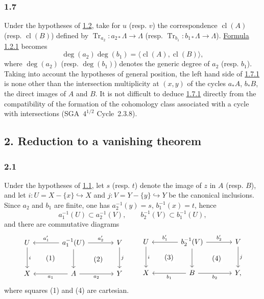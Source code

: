 \documentclass[11pt]{article}
\providecommand{\cl}{\operatorname{cl}}
\providecommand{\Tr}{\operatorname{Tr}}
\providecommand{\Tr}{\operatorname{Tr}}
\providecommand{\Tr}{\operatorname{Tr}}
\providecommand{\Tr}{\operatorname{Tr}}
\providecommand{\cl}{\operatorname{cl}}
\providecommand{\cl}{\operatorname{cl}}
\providecommand{\Tr}{\operatorname{Tr}}
\begin{document}
\subsubsection*{1.7}\label{sga5:IIIB:subsubsection:1.7}
Under the hypotheses of \hyperref[sga5:IIIB:theorem:1.2]{1.2}, take for $u$ (resp. $v$) the correspondence $\cl(A)$ (resp. $\cl(B)$) defined by $\Tr_{a_2}:a_{2*}\Lambda\to\Lambda$ (resp. $\Tr_{b_1}:b_{1*}\Lambda\to\Lambda$). \hyperref[sga5:IIIB:equation:1.2.1]{Formula 1.2.1} becomes
\begin{equation}\tag{1.7.1}\label{sga5:IIIB:equation:1.7.1}
\deg(a_2)\deg(b_1)=\langle \cl(A),\cl(B)\rangle,
\end{equation}
where $\deg(a_2)$ (resp. $\deg(b_1)$) denotes the generic degree of $a_2$ (resp. $b_1$). Taking into account the hypotheses of general position, the left hand side of \hyperref[sga5:IIIB:equation:1.7.1]{1.7.1} is none other than the intersection multiplicity at $(x,y)$ of the cycles $a_*A$, $b_*B$, the direct images of $A$ and $B$. It is not difficult to deduce \hyperref[sga5:IIIB:equation:1.7.1]{1.7.1} directly from the compatibility of the formation of the cohomology class associated with a cycle with intersections (SGA~$4^{1/2}$ Cycle~2.3.8).


\subsection*{2. Reduction to a vanishing theorem}\label{sga5:IIIB:subsection:2}

\subsubsection*{2.1}\label{sga5:IIIB:subsubsection:2.1}
Under the hypotheses of \hyperref[sga5:IIIB:subsubsection:1.1]{1.1}, let $s$ (resp. $t$) denote the image of $z$ in $A$ (resp. $B$), and let $i:U=X-\{x\}\hookrightarrow X$ and $j:V=Y-\{y\}\hookrightarrow Y$ be the canonical inclusions. Since $a_2$ and $b_1$ are finite, one has $a_2^{-1}(y)=s$, $b_1^{-1}(x)=t$, hence
\[
a_1^{-1}(U)\subset a_2^{-1}(V),\qquad b_2^{-1}(V)\subset b_1^{-1}(U),
\]
and there are commutative diagrams
\[
\begin{tikzcd}[column sep=large,row sep=large]
U \arrow[d,"i"] \arrow[rd,phantom,"(1)"{description}] & a_1^{-1}(U) \arrow[l,"a'_1"'] \arrow[r,"a'_2"] \arrow[d] \arrow[rd,phantom,"(2)"{description}] & V \arrow[d,"j"]\\
X & A \arrow[l,"a_1"] \arrow[r,"a_2"'] & Y
\end{tikzcd}
\qquad
\begin{tikzcd}[column sep=large,row sep=large]
U \arrow[d,"i"] \arrow[rd,phantom,"(3)"{description}] & b_2^{-1}(V) \arrow[l,"b'_1"'] \arrow[r,"b'_2"] \arrow[d] \arrow[rd,phantom,"(4)"{description}] & V \arrow[d,"j"]\\
X & B \arrow[l,"b_1"] \arrow[r,"b_2"'] & Y ,
\end{tikzcd}
\]
where squares (1) and (4) are cartesian.
\end{document}
